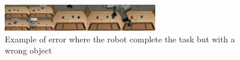 \begin{figure}[bth!]
    \centering
    \includegraphics[width=0.6\textwidth]{Figures/images/baseline_pick_place_error/pick_place_trj.png}
    \caption{Example of error where the robot complete the task but with a wrong object}
    \label{fig:baseline_pick_place_error}
\end{figure}
